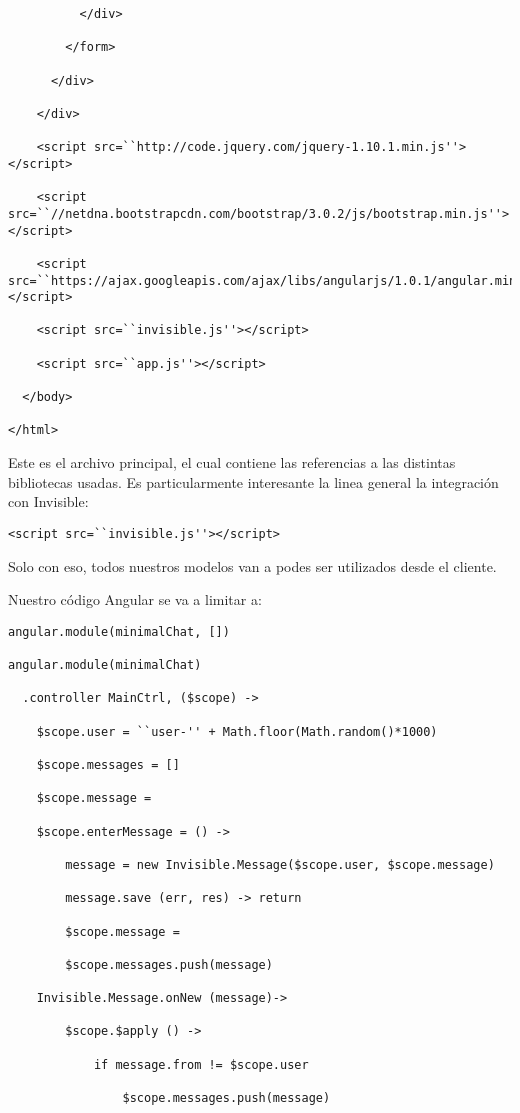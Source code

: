 \documentclass[doc,helv,longtable]{article}
\begin{document}
\begin{verbatim}
          </div>    

        </form>

      </div>

    </div>

    <script src=``http://code.jquery.com/jquery-1.10.1.min.js''></script>

    <script src=``//netdna.bootstrapcdn.com/bootstrap/3.0.2/js/bootstrap.min.js''></script>

    <script src=``https://ajax.googleapis.com/ajax/libs/angularjs/1.0.1/angular.min.js''></script>

    <script src=``invisible.js''></script>

    <script src=``app.js''></script>

  </body>

</html>
\end{verbatim}

Este es el archivo principal, el cual contiene las referencias a las distintas bibliotecas usadas. Es particularmente interesante la linea general la integración con Invisible:

\begin{verbatim}
<script src=``invisible.js''></script>
\end{verbatim}

Solo con eso, todos nuestros modelos van a podes ser utilizados desde el cliente.

Nuestro código Angular se va a limitar a:

\begin{verbatim}
angular.module(minimalChat, [])

angular.module(minimalChat)

  .controller MainCtrl, ($scope) ->

    $scope.user = ``user-'' + Math.floor(Math.random()*1000)

    $scope.messages = []

    $scope.message = 

    $scope.enterMessage = () ->

        message = new Invisible.Message($scope.user, $scope.message)

        message.save (err, res) -> return

        $scope.message = 

        $scope.messages.push(message)

    Invisible.Message.onNew (message)->

        $scope.$apply () ->

            if message.from != $scope.user

                $scope.messages.push(message)
\end{verbatim}
\end{document}
